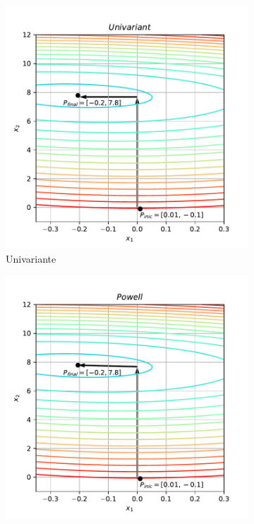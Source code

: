 \documentclass[10pt, a4paper]{article}
\begin{document}
\begin{figure}[htpb]
  \centering
  \begin{subfigure}[b]{0.32\textwidth}
      \centering
      \includegraphics[width=\textwidth]{images/q2a_Univariant.pdf}
      \caption{Univariante}
      \label{fig:q2a_univariant}
  \end{subfigure}
  \hfill
  \begin{subfigure}[b]{0.32\textwidth}
    \centering
    \includegraphics[width=\textwidth]{images/q2a_Powell.pdf}

\end{subfigure}
\end{figure}
\end{document}

